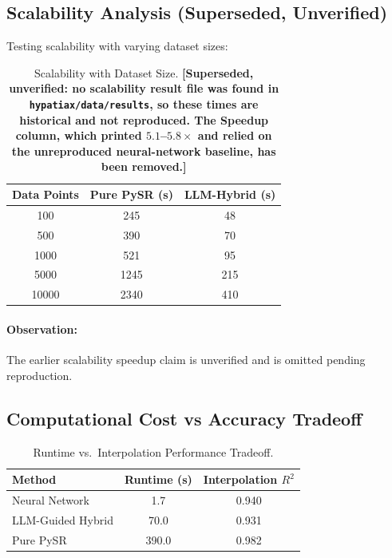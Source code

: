 \documentclass[twoside,11pt]{article}
\begin{document}
\subsection{Scalability Analysis (Superseded, Unverified)}

Testing scalability with varying dataset sizes:

\begin{table}[H]
\centering
\caption{Scalability with Dataset Size.
  \textbf{[Superseded, unverified: no scalability result file was found in
  \texttt{hypatiax/data/results}, so these times are historical and not reproduced.
  The Speedup column, which printed $5.1$--$5.8\times$ and relied on the unreproduced
  neural-network baseline, has been removed.]}}
\label{tab:scalability}
\begin{tabular}{@{}ccc@{}}
\toprule
\textbf{Data Points} & \textbf{Pure PySR (s)} & \textbf{LLM-Hybrid (s)} \\
\midrule
100 & 245 & 48 \\
500 & 390 & 70 \\
1000 & 521 & 95 \\
5000 & 1245 & 215 \\
10000 & 2340 & 410 \\
\bottomrule
\end{tabular}
\end{table}

\paragraph{Observation:} The earlier scalability speedup claim is unverified and is omitted pending reproduction.

\subsection{Computational Cost vs Accuracy Tradeoff}

\begin{table}[H]
\centering
\caption{Runtime vs.\ Interpolation Performance Tradeoff. }
\label{tab:cost_accuracy_tradeoff}
\begin{tabular}{lcc}
\toprule
\textbf{Method} & \textbf{Runtime (s)} & \textbf{Interpolation $R^2$} \\
\midrule
Neural Network & 1.7 & 0.940 \\
LLM-Guided Hybrid & 70.0 & 0.931 \\
Pure PySR & 390.0 & 0.982 \\
\bottomrule
\end{tabular}
\end{table}
\end{document}
